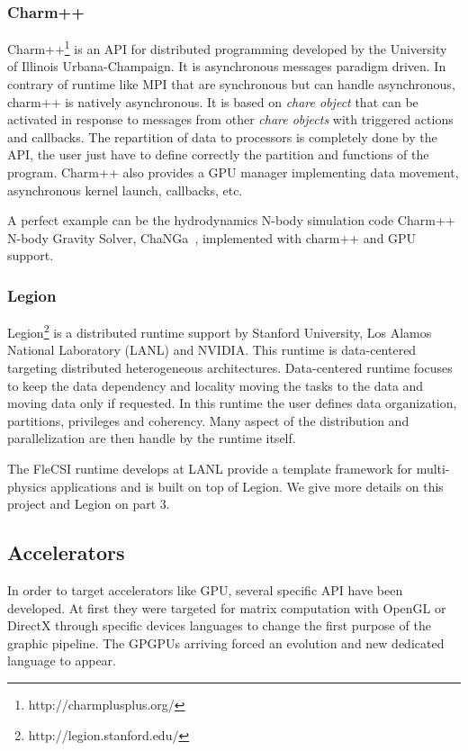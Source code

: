 \subsubsection{Charm++}
Charm++\footnote{http://charmplusplus.org/} is an API for distributed programming developed by the University of Illinois Urbana-Champaign.
It is asynchronous messages paradigm driven.
In contrary of runtime like MPI that are synchronous but can handle asynchronous, charm++ is natively asynchronous. 
It is based on \textit{chare object} that can be activated in response to messages from other \textit{chare objects} with triggered actions and callbacks. 
The repartition of data to processors is completely done by the API, the user just have to define correctly the partition and functions of the program. 
Charm++ also provides a GPU manager implementing data movement, asynchronous kernel launch, callbacks, etc.

A perfect example can be the hydrodynamics N-body simulation code Charm++ N-body Gravity Solver, ChaNGa~\cite{jetley2010scaling}, implemented with charm++ and GPU support. 

\subsubsection{Legion}
Legion\footnote{http://legion.stanford.edu/} is a distributed runtime support by Stanford University, Los Alamos National Laboratory (LANL) and NVIDIA. 
This runtime is data-centered targeting distributed heterogeneous architectures. 
Data-centered runtime focuses to keep the data dependency and locality moving the tasks to the data and moving data only if requested. 
In this runtime the user defines data organization, partitions, privileges and coherency. 
Many aspect of the distribution and parallelization are then handle by the runtime itself.

The FleCSI runtime develops at LANL provide a template framework for multi-physics applications and is built on top of Legion. 
We give more details on this project and Legion on part 3.  

\subsection{Accelerators}
In order to target accelerators like GPU, several specific API have been developed. 
At first they were targeted for matrix computation with OpenGL or DirectX through specific devices languages to change the first purpose of the graphic pipeline. 
The GPGPUs arriving forced an evolution and new dedicated language to appear. 

